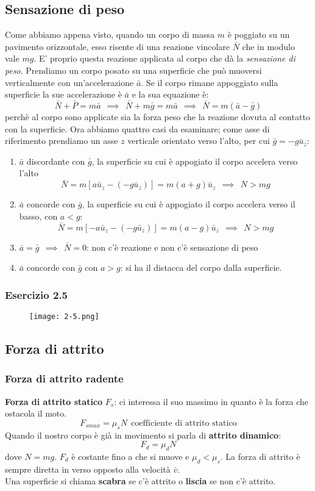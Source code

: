 \documentclass[../../main.tex]{subfiles}
\begin{document}
\subsection{Sensazione di peso}
Come abbiamo appena visto, quando un corpo di massa $m$ è poggiato su un pavimento orizzontale, esso risente di una reazione vincolare $\bar N$ che in modulo vale $mg$. E' proprio questa reazione applicata al corpo che dà la \textit{sensazione di peso}. Prendiamo un corpo posato su una superficie che può muoversi verticalmente con un'accelerazione $\bar a$. Se il corpo rimane appoggiato sulla superficie la sue accelerazione è $\bar a$ e la sua equazione è:
\[
    \bar N + \bar P = m\bar a \ \ \implies \ \ \bar N + m\bar g = m\bar a \ \ \implies \ \ \bar N = m(\bar a - \bar g)
\]
perchè al corpo sono applicate sia la forza peso che la reazione dovuta al contatto con la superficie. Ora abbiamo quattro casi da esaminare; come asse di riferimento prendiamo un asse $z$ verticale orientato verso l'alto, per cui $\bar g = -g\bar u_z$:
\begin{enumerate}
    \item $\bar a$ discordante con $\bar g$, la superficie su cui è appogiato il corpo accelera verso l'alto
          \[
              \bar N = m[a\bar u_z - (-g\bar u_z)] = m(a + g)\bar u_z \ \ \implies \ \ N > mg
          \]
    \item $\bar a$ concorde con $\bar g$, la superficie su cui è appogiato il corpo accelera verso il basso, con $a < g$:
          \[
              \bar N = m[-a\bar u_z - (-g\bar u_z)] = m(a - g)\bar u_z \ \ \implies \ \ N > mg
          \]
    \item $\bar a = \bar g \ \ \implies \ \ \bar N = 0$: non c'è reazione e non c'è sensazione di peso
    \item $\bar a$ concorde con $\bar g$ con $a > g$: si ha il distacca del corpo dalla superficie.
\end{enumerate}
\subsubsection{Esercizio 2.5}
\begin{figure}[H]
    \centering
    \texttt{[image: 2-5.png]}
\end{figure}
\subsection{Forza di attrito}

\subsubsection{Forza di attrito radente}
\textbf{Forza di attrito statico} $F_s$: ci interessa il suo massimo in quanto è la forza che ostacola il moto.
\[
    F_{s max} = \mu_s N \ \ \text{coefficiente di attrito statico}
\]
Quando il nostro corpo è già in movimento si parla di \textbf{attrito dinamico}:
\[
    F_d = \mu_d N
\]
dove $N = mg$. $F_d$ è costante fino a che si muove e $\mu_d < \mu_s$. La forza di attrito è sempre diretta in verso opposto alla velocità $\bar v$.\\
Una superficie si chiama \textbf{scabra} se c'è attrito o \textbf{liscia} se non c'è attrito.\\
\end{document}

